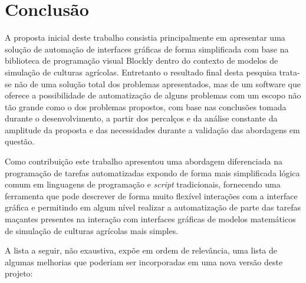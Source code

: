 \documentclass[tg]{mdtufsm}
\begin{document}
        \chapter {Conclusão}

            A proposta inicial deste trabalho consistia principalmente em apresentar uma solução de automação de interfaces gráficas de forma simplificada com base na biblioteca de programação visual Blockly dentro do contexto de modelos de simulação de culturas agrícolas. Entretanto o resultado final desta pesquisa trata-se não de uma solução total dos problemas apresentados, mas de um software que oferece a possibilidade de automatização de alguns problemas com um escopo não tão grande como o dos problemas propostos, com base nas conclusões tomada durante o desenvolvimento, a partir dos percalços e da análise constante da amplitude da proposta e das necessidades durante a validação das abordagens em questão.

            Como contribuição este trabalho apresentou uma abordagem diferenciada na programação de tarefas automatizadas expondo de forma mais simplificada lógica comum em linguagens de programação e \emph{script} tradicionais, fornecendo uma ferramenta que pode descrever de forma muito flexível interações com a interface gráfica e permitindo em algum nível realizar a automatização de parte das tarefas maçantes presentes na interação com interfaces gráficas de modelos matemáticos de simulação de culturas agrícolas mais simples.

            A lista a seguir, não exaustiva, expõe em ordem de relevância, uma lista de algumas melhorias que poderiam ser incorporadas em uma nova versão deste projeto:
\end{document}

